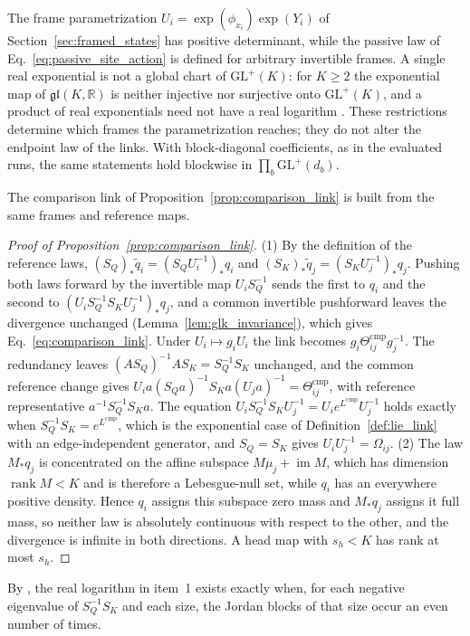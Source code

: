\documentclass[twoside,11pt]{article}
\begin{document}
The frame parametrization \(U_i=\exp(\phi_{x_i})\exp(Y_i)\) of Section~\ref{sec:framed_states} has positive determinant, while the passive law of Eq.~\eqref{eq:passive_site_action} is defined for arbitrary invertible frames. A single real exponential is not a global chart of \(\mathrm{GL}^+(K)\): for \(K\ge2\) the exponential map of \(\mathfrak{gl}(K,\mathbb R)\) is neither injective nor surjective onto \(\mathrm{GL}^+(K)\), and a product of real exponentials need not have a real logarithm \citep{culver1966existence}. These restrictions determine which frames the parametrization reaches; they do not alter the endpoint law of the links. With block-diagonal coefficients, as in the evaluated runs, the same statements hold blockwise in \(\prod_b\mathrm{GL}^+(d_b)\).

The comparison link of Proposition~\ref{prop:comparison_link} is built from the same frames and reference maps.
\begin{proof}[Proof of Proposition~\ref{prop:comparison_link}]
(1) By the definition of the reference laws, \((S_Q)_*\widetilde q_i=(S_QU_i^{-1})_*q_i\) and \((S_K)_*\widetilde q_j=(S_KU_j^{-1})_*q_j\). Pushing both laws forward by the invertible map \(U_iS_Q^{-1}\) sends the first to \(q_i\) and the second to \((U_iS_Q^{-1}S_KU_j^{-1})_*q_j\), and a common invertible pushforward leaves the divergence unchanged (Lemma~\ref{lem:glk_invariance}), which gives Eq.~\eqref{eq:comparison_link}. Under \(U_i\mapsto g_iU_i\) the link becomes \(g_i\Theta^{\mathrm{cmp}}_{ij}g_j^{-1}\). The redundancy leaves \((AS_Q)^{-1}AS_K=S_Q^{-1}S_K\) unchanged, and the common reference change gives \(U_ia(S_Qa)^{-1}S_Ka(U_ja)^{-1}=\Theta^{\mathrm{cmp}}_{ij}\), with reference representative \(a^{-1}S_Q^{-1}S_Ka\). The equation \(U_iS_Q^{-1}S_KU_j^{-1}=U_ie^{L^{\mathrm{cmp}}}U_j^{-1}\) holds exactly when \(S_Q^{-1}S_K=e^{L^{\mathrm{cmp}}}\), which is the exponential case of Definition~\ref{def:lie_link} with an edge-independent generator, and \(S_Q=S_K\) gives \(U_iU_j^{-1}=\Omega_{ij}\).
(2) The law \(M_*q_j\) is concentrated on the affine subspace \(M\mu_j+\operatorname{im}M\), which has dimension \(\operatorname{rank}M<K\) and is therefore a Lebesgue-null set, while \(q_i\) has an everywhere positive density. Hence \(q_i\) assigns this subspace zero mass and \(M_*q_j\) assigns it full mass, so neither law is absolutely continuous with respect to the other, and the divergence is infinite in both directions. A head map with \(s_h<K\) has rank at most \(s_h\).
\end{proof}
By \citet{culver1966existence}, the real logarithm in item~1 exists exactly when, for each negative eigenvalue of \(S_Q^{-1}S_K\) and each size, the Jordan blocks of that size occur an even number of times.
\end{document}
